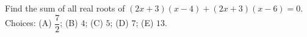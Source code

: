 Find the sum of all real roots of $(2x+3)(x-4)+(2x+3)(x-6)=0 $. Choices: (A) $\dfrac{7}{2}$; (B) $4$; (C) $5$; (D) $7$; (E) $13$.
